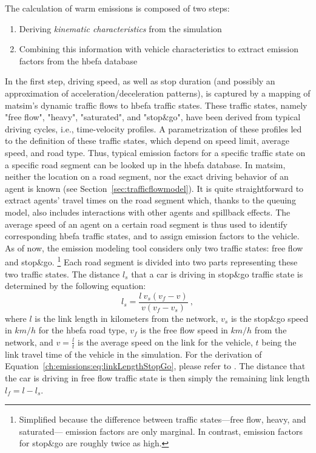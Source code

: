 The calculation of warm emissions is composed of two steps:
%
\begin{enumerate}
 \item Deriving \emph{kinematic characteristics} from the simulation
 \item Combining this information with vehicle characteristics to 
 extract emission factors from the \gls{hbefa} database
\end{enumerate}
%
In the first step, driving speed, as well as stop duration (and possibly an 
approximation of acceleration/deceleration patterns), is captured by a 
mapping of \gls{matsim}'s dynamic traffic flows to \gls{hbefa} traffic states. 
These traffic states, namely "free flow", "heavy", "saturated", and "stop\&go", 
have been derived from typical driving cycles, i.e., time-velocity profiles. 
A parametrization of these profiles led to the definition of these traffic 
states, which depend on speed limit, average speed, and road type. Thus, 
typical emission factors for a specific traffic state on a specific road segment 
can be looked up in the \gls{hbefa} database.
%
In \gls{matsim}, neither the location on a road segment, nor the exact driving behavior of an agent is known (see Section~\ref{sec:trafficflowmodel}).
%
%
It is quite straightforward to extract agents' travel times on the road segment which, thanks to the queuing model, also includes interactions with other agents and spillback effects.
%
The average speed of an agent on a certain road segment is thus used to 
identify corresponding \gls{hbefa} traffic states, and to assign emission 
factors to the vehicle. As of now, the emission modeling tool considers only 
two traffic states: free flow and stop\&go.%
% 
\footnote{
%
Simplified because the difference between 
traffic states---free flow, heavy, and saturated--- emission factors are 
only marginal. In contrast, emission factors for 
stop\&go are roughly twice as high.
%
}
%
Each road segment is divided into two parts representing these two 
traffic states. The distance $l_s$ that a car is driving in stop\&go traffic 
state is determined by the following equation:
%
\begin{equation}
l_s = \frac{l \ v_s  (v_f-v)}{v (v_f - v_s)} \ ,
\label{ch:emissions:eq:linkLengthStopGo}
\end{equation}
%
where $l$ is the link length in kilometers from the network, $v_s$ is the stop\&go speed in $km/h$ for the \gls{hbefa} road type, $v_f$ is the free flow speed in $km/h$ from the network, and $v=\frac{l}{t}$ is the average speed on the link for the vehicle, $t$ being the link travel time of the vehicle in the simulation. For the derivation of Equation~\ref{ch:emissions:eq:linkLengthStopGo}, please refer to \citet{Kickhoefer_PhDThesis_2014}. The distance that the car is driving in free flow traffic state is then simply the remaining link length $l_f = l - l_s$.
